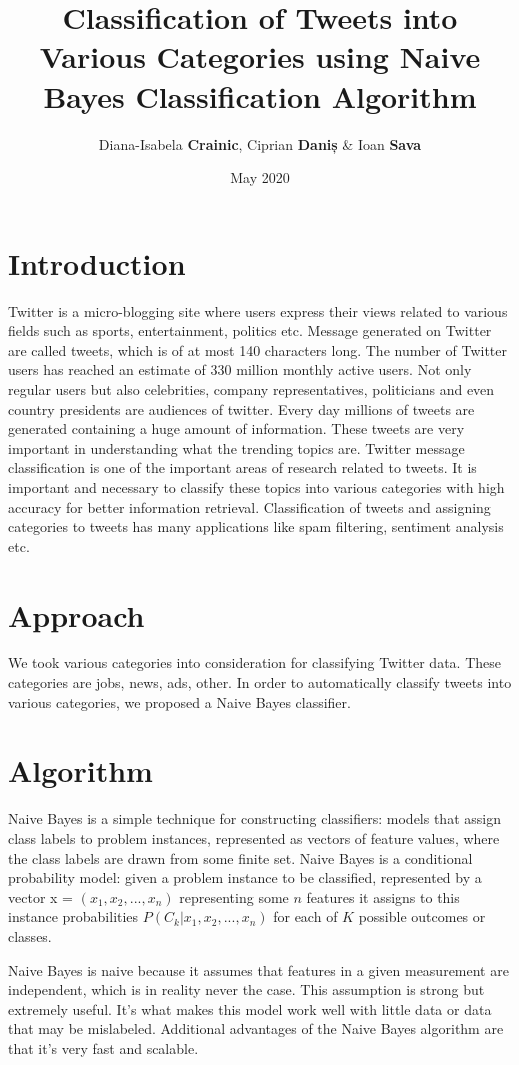 \documentclass{article}
\title{Classification of Tweets into Various Categories using Naive Bayes Classification Algorithm}
\author{Diana-Isabela \textbf{Crainic}, Ciprian \textbf{Daniș} \& Ioan \textbf{Sava}}
\date{May 2020}
\begin{document}
\maketitle

\section{Introduction}
\large
{
\quad
Twitter is a micro-blogging site where users express their
views related to various fields such as sports, entertainment,
politics etc. Message generated on Twitter are called tweets,
which is of at most 140 characters long. The number of
Twitter users has reached an estimate of 330 million monthly
active users. Not only regular users but also celebrities,
company representatives, politicians and even country
presidents are audiences of twitter. Every day millions of
tweets are generated containing a huge amount of
information. These tweets are very important in
understanding what the trending topics are. Twitter message
classification is one of the important areas of research
related to tweets. It is important and necessary to classify
these topics into various categories with high accuracy for
better information retrieval. Classification of tweets and
assigning categories to tweets has many applications like
spam filtering, sentiment analysis etc.\cite{introduction}
}


\section{Approach}
\large
{
\quad
We took various categories into consideration for classifying Twitter data.
These categories are jobs, news, ads, other.
In order to automatically classify tweets into various categories, we proposed a Naive Bayes classifier.
}

\section{Algorithm}
\large
{
\quad
Naive Bayes is a simple technique for constructing
classifiers: models that assign class labels to problem
instances, represented as vectors of feature values, where the
class labels are drawn from some finite set. Naive Bayes is
a conditional probability model: given a problem instance to
be classified, represented by a vector x =
$(x_1, x_2, ..., x_n)$ representing some $n$ features it assigns to this
instance probabilities
$P(C_k | x_1, x_2, ..., x_n)$ for each of $K$ possible outcomes or
classes.

Naive Bayes is naive because it assumes that features in a given measurement are independent, which is in reality never the case. This assumption is strong but extremely useful. It’s what makes this model work well with little data or data that may be mislabeled. Additional advantages of the Naive Bayes algorithm are that it’s very fast and scalable.\cite{naive_property}

}
\end{document}
